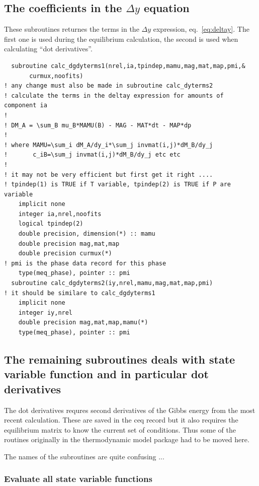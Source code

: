 \documentclass[12pt]{article}
\begin{document}
\subsection{The coefficients in the $\Delta y$ equation}\label{sec:calcdy}

These subroutines returnes the terms in the $\Delta y$ expression,
eq.~\ref{eq:deltay}.  The first one is used during the equilibrium
calculation, the second is used when calculating ``dot derivatives''.

{\small
\begin{verbatim}
  subroutine calc_dgdyterms1(nrel,ia,tpindep,mamu,mag,mat,map,pmi,&
       curmux,noofits)
! any change must also be made in subroutine calc_dyterms2
! calculate the terms in the deltay expression for amounts of component ia
!
! DM_A = \sum_B mu_B*MAMU(B) - MAG - MAT*dt - MAP*dp
!
! where MAMU=\sum_i dM_A/dy_i*\sum_j invmat(i,j)*dM_B/dy_j
!       c_iB=\sum_j invmat(i,j)*dM_B/dy_j etc etc
!
! it may not be very efficient but first get it right ....
! tpindep(1) is TRUE if T variable, tpindep(2) is TRUE if P are variable
    implicit none
    integer ia,nrel,noofits
    logical tpindep(2)
    double precision, dimension(*) :: mamu
    double precision mag,mat,map
    double precision curmux(*)
! pmi is the phase data record for this phase
    type(meq_phase), pointer :: pmi
  subroutine calc_dgdyterms2(iy,nrel,mamu,mag,mat,map,pmi)
! it should be similare to calc_dgdyterms1
    implicit none
    integer iy,nrel
    double precision mag,mat,map,mamu(*)
    type(meq_phase), pointer :: pmi
\end{verbatim}
}

\subsection{The remaining subroutines deals with state variable
function and in particular dot derivatives}

The dot derivatives requres second derivatives of the Gibbs energy
from the most recent calculation.  These are saved in the ceq record
but it also requires the equilibrium matrix to know the current set of
conditions.  Thus some of the routines originally in the thermodynamic
model package had to be moved here.

The names of the subroutines are quite confusing ...

\subsubsection{Evaluate all state variable functions}
\end{document}
